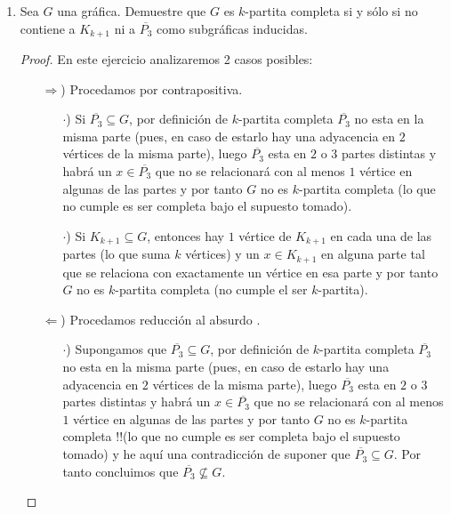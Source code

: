 \documentclass{article}
\begin{document}
\begin{enumerate}
\item Sea $G$ una gr\'afica.   Demuestre que $G$ es $k$-partita completa si y
  s\'olo si no contiene a $K_{k+1}$ ni a $\overline{P_3}$ como subgr\'aficas
  inducidas.
  
  \begin{proof}
    En este ejercicio analizaremos 2 casos posibles:
    
    \begin{itemize}
    \item[$\Rightarrow$)] Procedamos por contrapositiva.

      \begin{itemize}
      \item[$\cdot$)] Si $\overline{P_3} \subseteq G$, por definición
        de $k$-partita completa $\overline{P_3}$ no esta en la misma
        parte (pues, en caso de estarlo hay una adyacencia en $2$ vértices
        de la misma parte), luego $\overline{P_3}$ esta en $2$ o $3$
        partes distintas y habrá un $x \in \overline{P_3}$ que no se
        relacionará con al menos $1$ vértice en algunas de las partes
        y por tanto $G$ no es $k$-partita completa (lo que no cumple es
        ser completa bajo el supuesto tomado).
        
      \item[$\cdot$)] Si $K_{k + 1} \subseteq G$, entonces hay $1$ vértice
        de $K_{k + 1}$ en cada una de las partes (lo que suma $k$ v\'ertices) y un
        $x \in K_{k + 1}$ en alguna parte tal que se relaciona con exactamente
        un v\'ertice en esa parte y por tanto $G$ no es $k$-partita completa
        (no cumple el ser $k$-partita).
      \end{itemize}
    \item[$\Leftarrow$)] Procedamos reducción al absurdo .
      
      \begin{itemize}
      \item[$\cdot$)] Supongamos que $\overline{P_3} \subseteq G$, por
        definición de $k$-partita completa $\overline{P_3}$ no esta en
        la misma parte (pues, en caso de estarlo hay una adyacencia en
        $2$ vértices de la misma parte), luego $\overline{P_3}$ esta en
        $2$ o $3$ partes distintas y habrá un $x \in \overline{P_3}$ que
        no se relacionará con al menos $1$ vértice en algunas de las partes
        y por tanto $G$ no es $k$-partita completa !!(lo que no cumple es
        ser completa bajo el supuesto tomado) y he aquí una contradicción
        de suponer que $\overline{P_3} \subseteq G$. Por tanto concluimos
        que $\overline{P_3} \nsubseteq G$.
        

\end{itemize}
\end{itemize}
\end{proof}
\end{enumerate}
\end{document}
